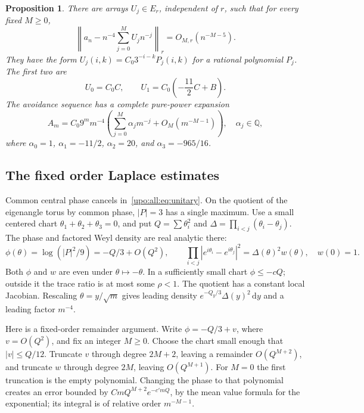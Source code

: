 \documentclass[11pt,letterpaper]{article}
\newtheorem{proposition}[theorem]{Proposition}
\theoremstyle{remark}\newtheorem{remark}[theorem]{Remark}
\numberwithin{equation}{section}
\newcommand{\dd}{\,\mathrm d}
\begin{document}
\begin{proposition}\label{upo:all:prop:Banach}
There are arrays $U_j\in E_r$, independent of $r$, such that for every
fixed $M\ge0$,
\begin{equation}\label{upo:all:eq:Banach}
\left\|a_n-n^{-4}\sum_{j=0}^M U_j n^{-j}\right\|_r
 =O_{M,r}(n^{-M-5}).
\end{equation}
They have the form $U_j(i,k)=C_0 3^{-i-k}P_j(i,k)$ for a rational
polynomial $P_j$. The first two are
\begin{equation}\label{upo:all:eq:A01}
U_0=C_0C,\qquad U_1=C_0\left(-\frac{11}{2}C+B\right).
\end{equation}
The avoidance sequence has a complete pure-power expansion
\begin{equation}\label{upo:all:eq:avoidall}
A_m=C_0 9^m m^{-4}\left(\sum_{j=0}^M\alpha_jm^{-j}
 +O_M(m^{-M-1})\right),
\quad\alpha_j\in\mathbb Q,
\end{equation}
where $\alpha_0=1$, $\alpha_1=-11/2$, $\alpha_2=20$, and
$\alpha_3=-965/16$.
\end{proposition}

\subsection{The fixed order Laplace estimates}
Common central phase cancels in~\eqref{upo:all:eq:unitary}. On the quotient
of the eigenangle torus by common phase, $|P|=3$ has a single maximum.
Use a small centered chart $\theta_1+\theta_2+\theta_3=0$, and put
$Q=\sum\theta_i^2$ and $\Delta=\prod_{i<j}(\theta_i-\theta_j)$.
The phase and factored Weyl density are real analytic there:
\[
\phi(\theta)=\log(|P|^2/9)=-Q/3+O(Q^2),\qquad
\prod_{i<j}|e^{i\theta_i}-e^{i\theta_j}|^2
 =\Delta(\theta)^2 w(\theta),\quad w(0)=1.
\]
Both $\phi$ and $w$ are even under $\theta\mapsto-\theta$.
In a sufficiently small chart $\phi\le-cQ$; outside it the trace ratio
is at most some $\rho<1$. The quotient has a constant local Jacobian.
Rescaling $\theta=y/\sqrt m$ gives leading density
$e^{-Q_y/3}\Delta(y)^2\dd y$ and a leading factor $m^{-4}$.

Here is a fixed-order remainder argument. Write
$\phi=-Q/3+v$, where $v=O(Q^2)$, and fix an integer $M\ge0$.
Choose the chart small enough that $|v|\le Q/12$. Truncate
$v$ through degree $2M+2$, leaving a remainder $O(Q^{M+2})$,
and truncate $w$ through degree $2M$, leaving $O(Q^{M+1})$.
For $M=0$ the first truncation is the empty polynomial.
Changing the phase to that polynomial creates an error bounded by
$C mQ^{M+2}e^{-c'mQ}$, by the mean value formula for the exponential;
its integral is of relative order $m^{-M-1}$.
\end{document}

